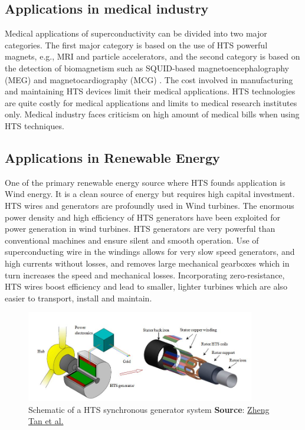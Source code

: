 \documentclass{article}
\begin{document}
	\subsection{Applications in medical industry}
	Medical applications of superconductivity can be divided into two major categories. The first major category is based on the use of HTS powerful magnets, e.g., MRI and particle accelerators, and the second category is based on the detection of biomagnetism such as SQUID-based magnetoencephalography (MEG) and magnetocardiography (MCG) \cite{Hirano}.  The cost involved in manufacturing and maintaining HTS devices limit their medical applications. HTS technologies are quite costly for medical applications and limits to medical research institutes only. Medical industry faces criticism on high amount of medical bills when using HTS techniques.
	
	\subsection{Applications in Renewable Energy}
	One of the primary renewable energy source where HTS founds application is Wind energy. It is a clean source of energy but requires high capital investment. HTS wires and generators are profoundly used in Wind turbines. The enormous power density and high efficiency of HTS generators have been exploited for power generation in wind turbines. HTS generators are very powerful than conventional machines and ensure silent and smooth operation. Use of superconducting wire in the windings allows for very slow speed generators, and high currents without losses, and removes large mechanical gearboxes which in turn increases the speed and mechanical losses. Incorporating zero-resistance, HTS wires boost efficiency and lead to smaller, lighter turbines which are also easier to transport, install and maintain.
	
	\begin{figure}[h]
		\centering
		\includegraphics[width=10cm]{hts_wind_turbine.jpeg}
		\caption{Schematic of a HTS synchronous generator system \textbf{Source}: \href{https://www.intechopen.com/books/advances-in-wind-power/wind-turbine-generator-technologies}{Zheng Tan et al.}}
	\end{figure}
	
\end{document}
